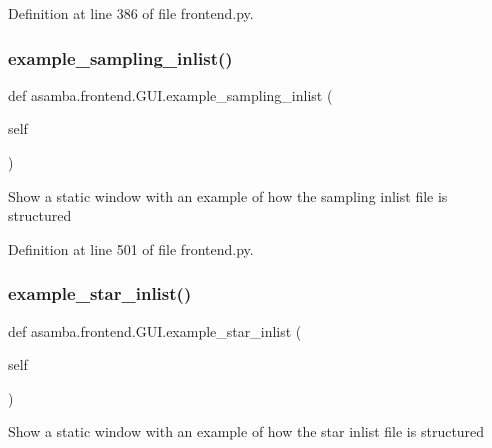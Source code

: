 Definition at line 386 of file frontend.\+py.

\mbox{\label{classasamba_1_1frontend_1_1_g_u_i_a1a0a42d5c06ceb02b8a48dd7ff2f686e}} 
\subsubsection{\texorpdfstring{example\+\_\+sampling\+\_\+inlist()}{example\_sampling\_inlist()}}
{\footnotesize\ttfamily def asamba.\+frontend.\+G\+U\+I.\+example\+\_\+sampling\+\_\+inlist (\begin{DoxyParamCaption}\item[{}]{self }\end{DoxyParamCaption})}

\begin{DoxyVerb}Show a static window with an example of how the sampling inlist file is structured \end{DoxyVerb}
 

Definition at line 501 of file frontend.\+py.

\mbox{\label{classasamba_1_1frontend_1_1_g_u_i_a30a1139534dbd25b7635bd39c649a219}} 
\subsubsection{\texorpdfstring{example\+\_\+star\+\_\+inlist()}{example\_star\_inlist()}}
{\footnotesize\ttfamily def asamba.\+frontend.\+G\+U\+I.\+example\+\_\+star\+\_\+inlist (\begin{DoxyParamCaption}\item[{}]{self }\end{DoxyParamCaption})}

\begin{DoxyVerb}Show a static window with an example of how the star inlist file is structured \end{DoxyVerb}
 


